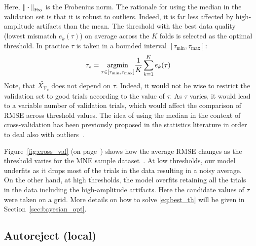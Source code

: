Here, ${\| \cdot \|}_{\mathrm{Fro}}$ is the Frobenius norm. The rationale for using the median in the validation set is that it is robust to outliers. Indeed, it is far less affected by high-amplitude artifacts than the mean. The threshold with the best data quality (lowest mismatch $e_{k}(\tau)$) on average across the $K$ folds is selected as the optimal threshold. In practice $\tau$ is taken in a bounded interval $[\tau_{\min}, \tau_{\max}]$:
%
\begin{equation}
\tau_{\star} = \underset{\tau \in [\tau_{\min}, \tau_{\max}]} {\mathop{\mathrm{argmin}}} \frac{1}{K} \sum_{k=1}^{K}  e_{k}(\tau)
\label{eq:best_th}
\end{equation}
Note, that $\widetilde{X_{\mathcal{V}_k}}$ does not depend on $\tau$. Indeed, it would not be wise to restrict the validation set to good trials according to the value of $\tau$. As $\tau$ varies, it would lead to a variable number of validation trials, which would affect the comparison of RMSE across threshold values. The idea of using the median in the context of cross-validation has been previously proposed in the statistics literature in order to deal also with outliers~\citep{zheng1998cross, leung2005cross,de2003robust}.

Figure~\ref{fig:cross_val} (on page~\pageref{fig:cross_val}) shows how the average RMSE changes as the threshold varies for the MNE sample dataset~\citep{gramfort2013meg,mne}. At low thresholds, our model underfits as it drops most of the trials in the data resulting in a noisy average. On the other hand, at high thresholds, the model overfits retaining all the trials in the data including the high-amplitude artifacts. Here the candidate values of $\tau$ were taken on a grid. More details on how to solve \eqref{eq:best_th} will be given in Section~\ref{sec:bayesian_opt}.

\subsection{Autoreject (local)}
\label{sec:auto_local}

